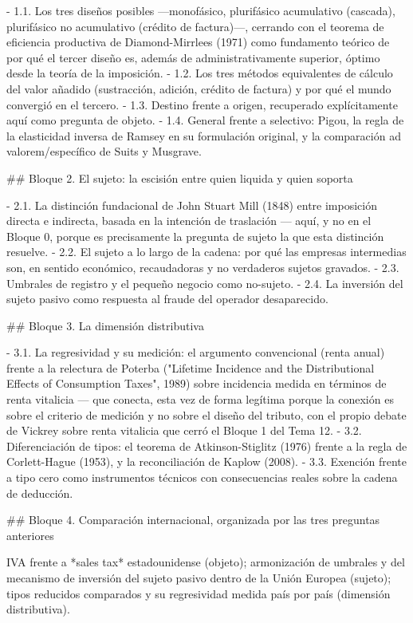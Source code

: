 \documentclass[10pt,a4paper]{article}
\begin{document}
- 1.1. Los tres diseños posibles —monofásico, plurifásico acumulativo (cascada), plurifásico no acumulativo (crédito de factura)—, cerrando con el teorema de eficiencia productiva de Diamond-Mirrlees (1971) como fundamento teórico de por qué el tercer diseño es, además de administrativamente superior, óptimo desde la teoría de la imposición.
- 1.2. Los tres métodos equivalentes de cálculo del valor añadido (sustracción, adición, crédito de factura) y por qué el mundo convergió en el tercero.
- 1.3. Destino frente a origen, recuperado explícitamente aquí como pregunta de objeto.
- 1.4. General frente a selectivo: Pigou, la regla de la elasticidad inversa de Ramsey en su formulación original, y la comparación ad valorem/específico de Suits y Musgrave.

## Bloque 2. El sujeto: la escisión entre quien liquida y quien soporta

- 2.1. La distinción fundacional de John Stuart Mill (1848) entre imposición directa e indirecta, basada en la intención de traslación — aquí, y no en el Bloque 0, porque es precisamente la pregunta de sujeto la que esta distinción resuelve.
- 2.2. El sujeto a lo largo de la cadena: por qué las empresas intermedias son, en sentido económico, recaudadoras y no verdaderos sujetos gravados.
- 2.3. Umbrales de registro y el pequeño negocio como no-sujeto.
- 2.4. La inversión del sujeto pasivo como respuesta al fraude del operador desaparecido.

## Bloque 3. La dimensión distributiva

- 3.1. La regresividad y su medición: el argumento convencional (renta anual) frente a la relectura de Poterba ("Lifetime Incidence and the Distributional Effects of Consumption Taxes", 1989) sobre incidencia medida en términos de renta vitalicia — que conecta, esta vez de forma legítima porque la conexión es sobre el criterio de medición y no sobre el diseño del tributo, con el propio debate de Vickrey sobre renta vitalicia que cerró el Bloque 1 del Tema 12.
- 3.2. Diferenciación de tipos: el teorema de Atkinson-Stiglitz (1976) frente a la regla de Corlett-Hague (1953), y la reconciliación de Kaplow (2008).
- 3.3. Exención frente a tipo cero como instrumentos técnicos con consecuencias reales sobre la cadena de deducción.

## Bloque 4. Comparación internacional, organizada por las tres preguntas anteriores

IVA frente a *sales tax* estadounidense (objeto); armonización de umbrales y del mecanismo de inversión del sujeto pasivo dentro de la Unión Europea (sujeto); tipos reducidos comparados y su regresividad medida país por país (dimensión distributiva).
\end{document}

